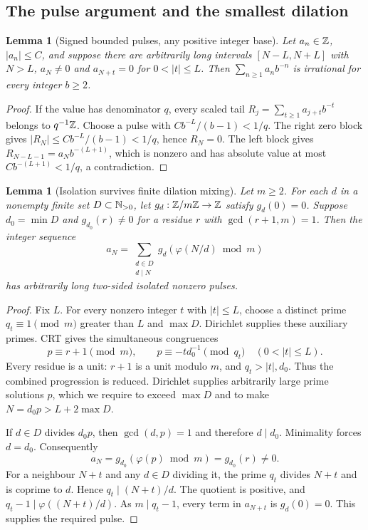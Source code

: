 \documentclass[11pt,a4paper]{article}
\newtheorem{lemma}[theorem]{Lemma}
\theoremstyle{definition}\newtheorem{definition}[theorem]{Definition}
\theoremstyle{remark}\newtheorem{remark}[theorem]{Remark}
\newcommand{\ph}{\varphi}\newcommand{\rad}{\operatorname{rad}}
\begin{document}
\subsection{The pulse argument and the smallest dilation}
\begin{lemma}[Signed bounded pulses, any positive integer base]\label{lem:pulse}
Let $a_n\in\mathbb Z$, $|a_n|\le C$, and suppose there are arbitrarily long intervals
$[N-L,N+L]$ with $N>L$, $a_N\ne0$ and $a_{N+t}=0$ for $0<|t|\le L$.
Then $\sum_{n\ge1}a_n b^{-n}$ is irrational for every integer $b\ge2$.
\end{lemma}
\begin{proof}
If the value has denominator $q$, every scaled tail
$R_j=\sum_{t\ge1}a_{j+t}b^{-t}$ belongs to $q^{-1}\mathbb Z$.
Choose a pulse with $Cb^{-L}/(b-1)<1/q$.
The right zero block gives $|R_N|\le Cb^{-L}/(b-1)<1/q$, hence $R_N=0$.
The left block gives $R_{N-L-1}=a_Nb^{-(L+1)}$, which is nonzero and
has absolute value at most $Cb^{-(L+1)}<1/q$, a contradiction.
\end{proof}

\begin{lemma}[Isolation survives finite dilation mixing]\label{lem:dilation}
Let $m\ge2$. For each $d$ in a nonempty finite set $D\subset\mathbb N_{>0}$, let
$g_d:\mathbb Z/m\mathbb Z\to\mathbb Z$ satisfy $g_d(0)=0$. Suppose $d_0=\min D$ and
$g_{d_0}(r)\ne0$ for a residue $r$ with $\gcd(r+1,m)=1$.
Then the integer sequence
\[
 a_N=\sum_{\substack{d\in D\\d\mid N}}
 g_d(\ph(N/d)\bmod m)
\]
has arbitrarily long two-sided isolated nonzero pulses.
\end{lemma}
\begin{proof}
Fix $L$. For every nonzero integer $t$ with $|t|\le L$, choose a distinct
prime $q_t\equiv1\pmod m$ greater than $L$ and $\max D$.
Dirichlet supplies these auxiliary primes.
CRT gives the simultaneous congruences
\[
 p\equiv r+1\pmod m,\qquad
 p\equiv-t d_0^{-1}\pmod{q_t}\quad(0<|t|\le L).
\]
Every residue is a unit: $r+1$ is a unit modulo $m$, and $q_t>|t|,d_0$.
Thus the combined progression is reduced. Dirichlet supplies arbitrarily
large prime solutions $p$, which we require to exceed $\max D$ and to make
$N=d_0p>L+2\max D$.

If $d\in D$ divides $d_0p$, then $\gcd(d,p)=1$ and therefore $d\mid d_0$.
Minimality forces $d=d_0$. Consequently
\[
 a_N=g_{d_0}(\ph(p)\bmod m)=g_{d_0}(r)\ne0.
\]
For a neighbour $N+t$ and any $d\in D$ dividing it, the prime $q_t$ divides
$N+t$ and is coprime to $d$. Hence $q_t\mid(N+t)/d$.
The quotient is positive, and $q_t-1\mid\ph((N+t)/d)$.
As $m\mid q_t-1$, every term in $a_{N+t}$ is $g_d(0)=0$.
This supplies the required pulse.
\end{proof}
\end{document}
